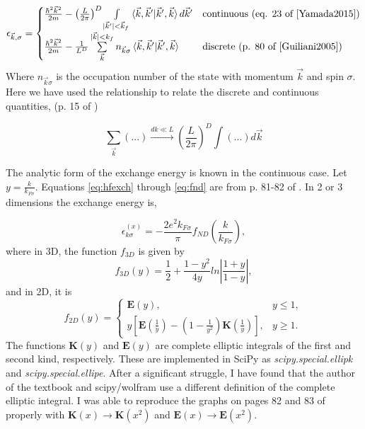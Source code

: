 \documentclass{revtex4}
\begin{document}
\begin{equation}
\epsilon_{\vec{k},\sigma}=
\begin{cases}
	\frac{\hbar^2\vec{k}^2}{2m}-\left(\frac{L}{2\pi}\right)^D\int\limits_{|\vec{k}'|<\vec{k}_f}^{}\braket{\vec{k}, \vec{k}' |\vec{k}', \vec{k}}d\vec{k}'
	&\text{continuous (eq. 23 of \cite{Yamada2015})} \\
	\frac{\hbar^2\vec{k}^2}{2m} - \frac{1}{L^D} \sum\limits_{\vec{k}}^{|\vec{k}|< k_f}n_{\vec{k}\sigma}\braket{\vec{k}, \vec{k}' |\vec{k}', \vec{k}}
	&\text{discrete (p. 80 of \cite{Guiliani2005})}
\end{cases}
\end{equation}
Where $n_{\vec{k}\sigma}$ is the occupation number of the state with momentum $\vec{k}$ and spin $\sigma$. Here we have used the relationship to relate the discrete and continuous quantities, (p. 15 of \cite{Guiliani2005})

\begin{equation}
	\sum\limits_{\vec{k}}^{}{(...)}\xrightarrow{\text{$dk \ll L$}}\left(\frac{L}{2\pi}\right)^D\int (...)d\vec{k}
\end{equation}

The analytic form of the exchange energy is known in the continuous case. Let $y = \frac{k}{k_{F\sigma}}$. Equations \ref{eq:hfexch} through \ref{eq:fnd} are from p. 81-82 of \cite{Guiliani2005}. In 2 or 3 dimensions the exchange energy is, 

\begin{equation}\label{eq:hfexch}
\epsilon_{k\sigma}^{(x)} = -\frac{2e^2k_{F\sigma}}{\pi}f_{ND}\left(\frac{k}{k_{F\sigma}}\right),
\end{equation}
where in 3D, the function $f_{3D}$ is given by
\begin{equation}
f_{3D}\left(y\right) = \frac{1}{2} + \frac{1-y^2}{4y} ln \left|\frac{1+y}{1-y} \right|,
\end{equation}
and in 2D, it is
\begin{equation}\label{eq:fnd}
f_{2D}\left(y\right) = 
\begin{cases} 
    \mathbf{E}\left(y\right), &  y \leq 1, \\
    y 
    \left[ 
        \mathbf{E} 
        \left(
            \frac{1}{y} 
        \right)
        -
        \left(
            1 - \frac{1}{y^2}
        \right)
        \mathbf{K}
        \left(
            \frac{1}{y}
        \right)
       \right]  ,& y \geq 1. 
\end{cases}
\end{equation}
The functions $\mathbf{K}(y)$ and $ \mathbf{E}(y) $ are complete elliptic integrals of the first and second kind, respectively. These are implemented in SciPy as \emph{scipy.special.ellipk} and \emph{scipy.special.ellipe}. After a significant struggle, I have found that the author of the textbook\cite{Guiliani2005} and scipy/wolfram use a different definition of the complete elliptic integral. I was able to reproduce the graphs on pages 82 and 83 of \cite{Guiliani2005} properly with $\mathbf{K}(x) \rightarrow \mathbf{K}(x^2)$ and $\mathbf{E}(x) \rightarrow \mathbf{E}(x^2)$.
\end{document}

